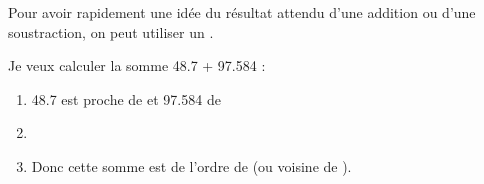 	\begin{mymeth}
		Pour avoir rapidement une idée du résultat attendu d'une addition ou d'une soustraction, on peut utiliser un \hspace*{5cm}.		
	\end{mymeth}

	\begin{myex}
		Je veux calculer la somme \num{48.7} + \num{97.584} : 
		\begin{enumerate}
			\item \num{48.7} est proche de \hspace*{2cm} et \num{97.584} de %
			\item %
			\item Donc cette somme est de l'ordre de \hspace*{2cm} (ou voisine de \hspace*{1.5cm}).
		\end{enumerate}
	\end{myex}